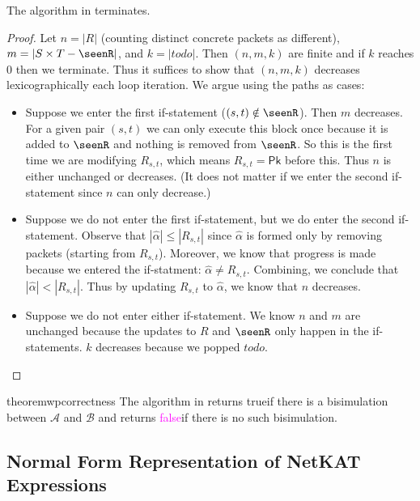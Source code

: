 \documentclass[acmsmall,dvipsnames,nonacm]{acmart}
\newcommand\todoR{\textit{todo}}
\newcommand\false{\textcolor{magenta}{false}}
\newcommand\true{\textcolor{codegreen}{true}}
\newcommand\Pk{\mathsf{Pk}}
\newcommand\sympk{\widehat\alpha}
\newcommand\NetKAT{\textsf{NetKAT}\xspace}
\begin{document}
\begin{lemma}\label{lem:wp-termination}
The algorithm in  terminates.
\end{lemma}
\begin{proof}
Let $n = |R|$ (counting distinct concrete packets as different), $m = |S\times T - \seenR|$,
and $k = |\todoR|$. Then $(n,m,k)$ are finite and if $k$ reaches 0 then we terminate.
Thus it suffices to show that $(n,m,k)$ decreases lexicographically each
loop iteration. We argue using the paths as cases:
\begin{itemize}
    \item Suppose we enter the first if-statement ($(s,t)\notin \seenR$). Then
        $m$ decreases. For a given pair $(s,t)$ we can only execute this block
        once because it is added to $\seenR$ and nothing is removed from
        $\seenR$. So this is the first time we are modifying $R_{s,t}$, which
        means $R_{s,t} = \Pk$ before this. Thus $n$ is either unchanged or
        decreases. (It does not matter if we enter the second if-statement since
        $n$ can only decrease.)
    \item Suppose we do not enter the first if-statement, but we do enter the
        second if-statement. Observe that $|\sympk| \leq |R_{s,t}|$ since
        $\sympk$ is formed only by removing packets (starting from $R_{s,t}$).
        Moreover, we know that progress is made because we entered the
        if-statment: $\sympk \neq R_{s,t}$. Combining, we conclude that $|\sympk| <
        |R_{s,t}|$.  Thus by updating $R_{s,t}$ to $\sympk$, we know that
        $n$ decreases.
    \item Suppose we do not enter either if-statement. We know $n$ and $m$ are unchanged
        because the updates to $R$ and $\seenR$ only happen in the if-statements.
        $k$ decreases because we popped $\todoR$.
\end{itemize}
\end{proof}

\begin{restatable}{theorem}{wpcorrectness}\label{thm:wp-correct}
The algorithm in  returns \true if there is a
bisimulation between $\mathcal{A}$ and $\mathcal{B}$ and returns
\false if there is no such bisimulation.
\end{restatable}


\subsection{Normal Form Representation of \NetKAT Expressions}\label{sec:nknf}
\end{document}
